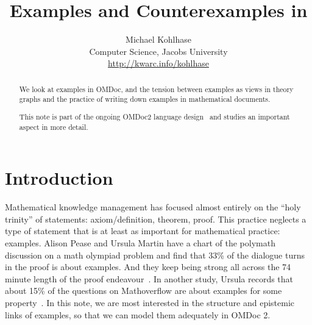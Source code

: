\documentclass[11pt]{bluenote}
\title{Examples and Counterexamples in \omdoc}
\author{Michael Kohlhase\\Computer Science,  Jacobs University\\\url{http://kwarc.info/kohlhase}}
\def\omdoc{OMDoc\xspace}
\def\omdocv#1{OMDoc#1\xspace}
\def\omdoc{OMDoc\xspace}
\begin{document}
\maketitle
\begin{abstract}
  We look at examples in \omdoc, and the tension between examples as views in theory
  graphs and the practice of writing down examples in mathematical documents. 

  This note is part of the ongoing \omdocv2 language design~\cite{Kohlhase:old13} and
  studies an important aspect in more detail.
\end{abstract}
\tableofcontents\newpage

\section{Introduction}

Mathematical knowledge management has focused almost entirely on the ``holy trinity'' of
statements: axiom/definition, theorem, proof. This practice neglects a type of statement
that is at least as important for mathematical practice: examples.  Alison Pease and
Ursula Martin have a chart of the polymath discussion on a math olympiad problem and find
that 33\% of the dialogue turns in the proof is about examples. And they keep being strong
all across the 74 minute length of the proof endeavour~\cite{PeaMar:sfmm12}. In another
study, Ursula records that about 15\% of the questions on Mathoverflow are about examples
for some property~\cite{MarPea:wmtapm13}. In this note, we are most interested in the
structure and epistemic links of examples, so that we can model them adequately in
\omdoc2. 
\end{document}
